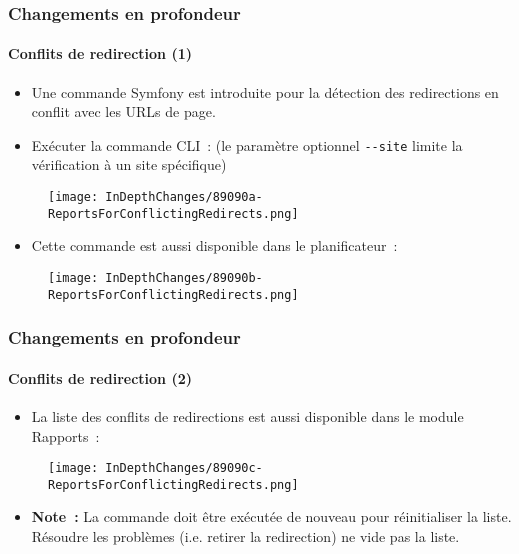 \begin{frame}[fragile]
	\frametitle{Changements en profondeur}
	\framesubtitle{Conflits de redirection (1)}

	\begin{itemize}
		\item Une commande Symfony est introduite pour la détection des redirections
			en conflit avec les URLs de page.
		\item Exécuter la commande CLI~:\newline
			\smaller
				(le paramètre optionnel \texttt{-}\texttt{-site} limite la vérification à un site spécifique)
			\normalsize
	\end{itemize}

	\begin{figure}
		\texttt{[image: InDepthChanges/89090a-ReportsForConflictingRedirects.png]}
	\end{figure}

	\begin{itemize}
		\item Cette commande est aussi disponible dans le planificateur~:
	\end{itemize}

	\begin{figure}
		\texttt{[image: InDepthChanges/89090b-ReportsForConflictingRedirects.png]}
	\end{figure}

\end{frame}


\begin{frame}[fragile]
	\frametitle{Changements en profondeur}
	\framesubtitle{Conflits de redirection (2)}

	\begin{itemize}
		\item La liste des conflits de redirections est aussi disponible dans le module Rapports~:
	\end{itemize}

	\begin{figure}
		\texttt{[image: InDepthChanges/89090c-ReportsForConflictingRedirects.png]}
	\end{figure}

	\begin{itemize}
		\item
			\small\textbf{Note~:}
				La commande doit être exécutée de nouveau pour réinitialiser la liste.
				Résoudre les problèmes (i.e. retirer la redirection) ne vide pas la liste.
			\normalsize
	\end{itemize}

\end{frame}

